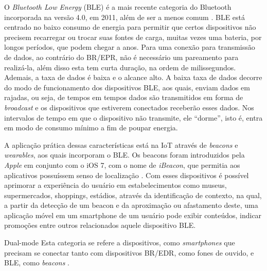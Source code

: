 O \textit{Bluetooth Low Energy} (BLE) é a mais recente categoria do Bluetooth incorporada 
na versão 4.0, em 2011, além de ser a menos comum \cite{linklabs2015}.
BLE está centrado no baixo consumo de energia para permitir que certos 
dispositivos não precisem recarregar ou trocar suas fontes de carga, muitas vezes uma bateria, por 
longos períodos, que podem chegar a anos. 
Para uma conexão para transmissão de dados, ao contrário do BR/EPR, não é necessário um pareamento 
para realizá-la, além disso esta tem curta duração, na ordem de milissegundos.
Ademais, a taxa de dados é baixa e o alcance alto. A baixa taxa de dados decorre do modo de 
funcionamento dos dispositivos BLE, aos quais, enviam dados em rajadas, ou seja, de tempos em 
tempos dados são transmitidos em forma de \textit{broadcast} e os dispositivos que estiverem 
conectados receberão esses dados. Nos intervalos de tempo em que o dispositivo não transmite, ele 
``dorme'', isto é, entra em modo de consumo mínimo a fim de poupar energia.

A aplicação prática dessas características está na IoT através de \textit{beacons} e  
\textit{wearables}, aos quais incorporam o BLE. Os beacons foram introduzidos pela \textit{Apple} 
em conjunto com o iOS 7, com o nome de \textit{iBeacon}, que permitia aos aplicativos 
possuíssem senso de localização \cite{apple2014}. 
Com esses dispositivos é possível 
aprimorar a experiência do usuário em estabelecimentos como museus, supermercados, shoppings, 
estádios, através da identificação de contexto, na qual, a partir da 
detecção de um beacon e da aproximação ou afastamento deste, uma aplicação móvel em um smartphone 
de um usuário pode exibir conteúdos, indicar promoções entre outros relacionados aquele dispositivo 
BLE.


Dual-mode
%
Esta categoria se refere a dispositivos, como \textit{smartphones} que precisam 
se conectar tanto com dispositivos BR/EDR, como fones de ouvido, e BLE, como 
\textit{beacons} \cite{sig2017}.

